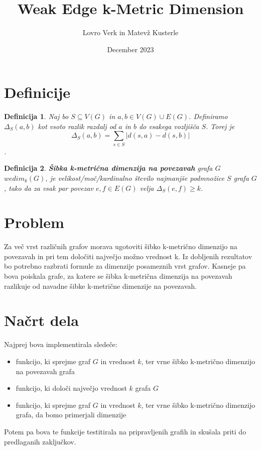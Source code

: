\documentclass[a4paper,12pt]{article}
\newtheorem{definition}{Definicija}
\begin{document}
\author{Lovro Verk in Matevž Kusterle}
\date{December 2023}
\title{Weak Edge k-Metric Dimension}
\maketitle

\section{Definicije}

    \begin{definition}
       Naj bo $S \subseteq V(G)$ in $a, b \in V(G) \cup E(G)$. Definiramo $\Delta_S (a,b)$ kot vsoto razlik razdalj od $a$ in $b$ do vsakega vozljišča $S$. Torej je $$\Delta_S (a,b) = \sum_{s \in S } |d(s,a) - d(s,b)|$$.
    \end{definition}

    \begin{definition}
        \textbf{Šibka k-metrična dimenzija na povezavah} grafa $G$ $wedim_k(G)$, je velikost/moč/kardinalno število
        najmanjše podmnožice $S$ grafa $G$, tako da za vsak par povezav $e,f \in E(G)$ velja $\Delta_S (e,f) \geq k$.
    \end{definition}

   
\pagebreak

\section{Problem} 
Za več vrst različnih grafov morava ugotoviti šibko k-metrično dimenzijo na povezavah in pri tem določiti največjo možno vrednost k. Iz dobljenih rezultatov bo potrebno razbrati formule za dimenzije posameznih vrst grafov. Kasneje pa bova poiskala grafe, za katere se šibka k-metrična dimenzija na povezavah razlikuje od navadne šibke k-metrične dimenzije na povezavah.
    
\section{Načrt dela}
Najprej bova implementirala sledeče:
    \begin{itemize}
        \item funkcijo, ki sprejme graf $G$ in vrednost $k$, ter vrne šibko k-metrično dimenzijo na povezavah grafa
        \item funkcijo, ki določi največjo vrednost $k$ grafa $G$
        \item funkcijo, ki sprejme graf $G$ in vrednost $k$, ter vrne šibko k-metrično dimenzijo grafa, da bomo primerjali dimenzije
    \end{itemize}

Potem pa bova te funkcije testitirala na pripravljenih grafih in skušala priti do predlaganih zaključkov.
\end{document}
